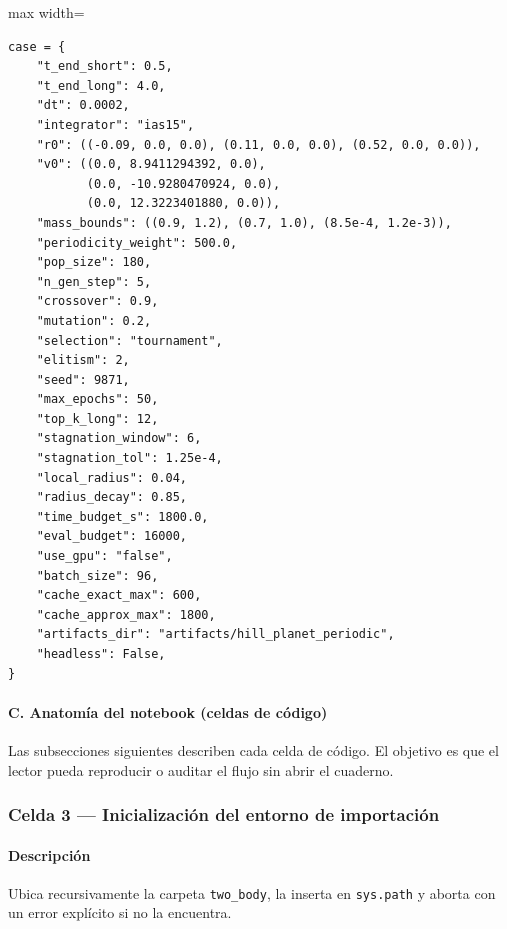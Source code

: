 \begin{listing}[H]
\caption{Declaración del diccionario \texttt{case} en el notebook Caso01}
\label{lst:c01_case}
\begin{adjustbox}{max width=\textwidth}
\begin{minipage}{\textwidth}
\begin{verbatim}
case = {
    "t_end_short": 0.5,
    "t_end_long": 4.0,
    "dt": 0.0002,
    "integrator": "ias15",
    "r0": ((-0.09, 0.0, 0.0), (0.11, 0.0, 0.0), (0.52, 0.0, 0.0)),
    "v0": ((0.0, 8.9411294392, 0.0),
           (0.0, -10.9280470924, 0.0),
           (0.0, 12.3223401880, 0.0)),
    "mass_bounds": ((0.9, 1.2), (0.7, 1.0), (8.5e-4, 1.2e-3)),
    "periodicity_weight": 500.0,
    "pop_size": 180,
    "n_gen_step": 5,
    "crossover": 0.9,
    "mutation": 0.2,
    "selection": "tournament",
    "elitism": 2,
    "seed": 9871,
    "max_epochs": 50,
    "top_k_long": 12,
    "stagnation_window": 6,
    "stagnation_tol": 1.25e-4,
    "local_radius": 0.04,
    "radius_decay": 0.85,
    "time_budget_s": 1800.0,
    "eval_budget": 16000,
    "use_gpu": "false",
    "batch_size": 96,
    "cache_exact_max": 600,
    "cache_approx_max": 1800,
    "artifacts_dir": "artifacts/hill_planet_periodic",
    "headless": False,
}
\end{verbatim}
\end{minipage}
\end{adjustbox}
\end{listing}

\paragraph{C. Anatomía del notebook (celdas de código)}
Las subsecciones siguientes describen cada celda de código. El objetivo es que el lector pueda reproducir o auditar el flujo sin abrir el cuaderno.

\subsubsection*{Celda 3 — Inicialización del entorno de importación}
\paragraph{Descripción} Ubica recursivamente la carpeta \texttt{two\_body}, la inserta en \texttt{sys.path} y aborta con un error explícito si no la encuentra.
